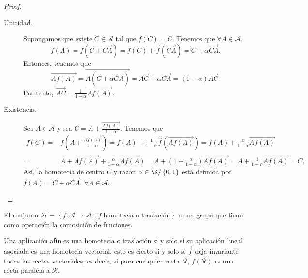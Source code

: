 \begin{proof}
\begin{description}
\item[Unicidad.] Supongamos que existe $\displaystyle C \in \mathcal{A} $ tal que $\displaystyle f\left(C\right) = C $. Tenemos que $\displaystyle \forall A \in \mathcal{A} $, 
	\[f\left(A\right) = f\left(C + \overrightarrow{CA} \right) = f\left(C\right) + \vec{f}\left(\overrightarrow{CA} \right) = C + \alpha \overrightarrow{CA}  .\]
Entonces, tenemos que 
\[\overrightarrow{Af\left(A\right)}  = \overrightarrow{A\left(C + \alpha \overrightarrow{CA} \right)} = \overrightarrow{AC} + \alpha \overrightarrow{CA} = \left(1-\alpha \right)\overrightarrow{AC}  .\]
Por tanto, $\displaystyle \overrightarrow{AC} = \frac{1}{1-\alpha }\overrightarrow{Af\left(A\right)}  $.
\item[Existencia.] Sea $\displaystyle A \in \mathcal{A} $ y sea $\displaystyle C = A + \frac{\overrightarrow{Af\left(A\right)} }{1-\alpha } $. Tenemos que 
	\[
	\begin{split}
		f\left(C\right) = & f\left(A + \frac{\overrightarrow{Af\left(A\right)} }{1-\alpha }\right) = f\left(A\right) +\frac{1}{1-\alpha }\vec{f}\left(\overrightarrow{Af\left(A\right)} \right) = f\left(A\right)+\frac{\alpha }{1-\alpha }\overrightarrow{Af\left(A\right)} \\
		= &  A + \overrightarrow{Af\left(A\right)} +\frac{\alpha }{1-\alpha }\overrightarrow{Af\left(A\right)} = A + \left(1+\frac{\alpha }{1-\alpha }\right)\overrightarrow{Af\left(A\right)} = A + \frac{1}{1-\alpha }\overrightarrow{Af\left(A\right)} = C  .
	\end{split}
	\]
	Así, la homotecia de centro $\displaystyle C $ y razón $\displaystyle \alpha \in \K / \left\{ 0,1\right\}  $ está definida por $\displaystyle f\left(A\right) = C + \alpha \overrightarrow{CA}  $, $\displaystyle \forall A \in \mathcal{A} $.	
\end{description}
\end{proof}
\begin{observation}
	\normalfont El conjunto $\displaystyle \mathcal{H} = \left\{ f : \mathcal{A} \to \mathcal{A} \; : \; f \; \text{homotecia o traslación}\right\}  $ es un grupo que tiene como operación la comosición de funciones.
\end{observation}
\begin{observation}
\normalfont Una aplicación afín es una homotecia o traslación si y solo si su aplicación lineal asociada es una homotecia vectorial, esto es cierto si y solo si $\displaystyle \vec{f} $ deja invariante todas las rectas vectoriales, es decir, si para cualquier recta $\displaystyle \mathcal{R} $, $\displaystyle f\left(\mathcal{R}\right) $ es una recta paralela a $\displaystyle \mathcal{R} $.
\end{observation}
